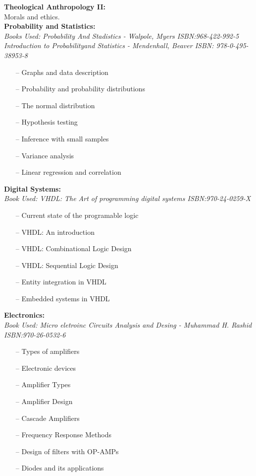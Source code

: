 \documentclass{article}
\begin{document}
\textbf{Theological Anthropology II:}\\
    Morals and ethics.\\
\newpage
\textbf{Probability and Statistics:}\\
    \emph{Books Used: Probability And Stadistics - Walpole, Myers    ISBN:968-422-992-5}\\
    \emph{Introduction to Probabilityand Statistics - Mendenhall, Beaver ISBN: 978-0-495-38953-8}\
    \begin{itemize}
     \setlength\itemsep{0pt}
        \item[--] Graphs and data description
        \item[--] Probability and probability distributions
        \item[--] The normal distribution
        \item[--] Hypothesis testing
        \item[--] Inference with small samples
        \item[--] Variance analysis
        \item[--] Linear regression and correlation
    \end{itemize}

\textbf{Digital Systems:}\\
        \emph{Book Used: VHDL: The Art of programming digital systems  ISBN:970-24-0259-X}
    \begin{itemize}
     \setlength\itemsep{0pt}
      \item[--] Current state of the programable logic
      \item[--] VHDL: An introduction
      \item[--] VHDL: Combinational Logic Design
      \item[--] VHDL: Sequential Logic Design
      \item[--] Entity integration in VHDL
      \item[--] Embedded systems in VHDL
    \end{itemize}
 
\textbf{Electronics:}\\
    \emph{Book Used: Micro eletroinc Circuits Analysis and Desing - Muhammad H. Rashid ISBN:970-26-0532-6}
       \begin{itemize}
     \setlength\itemsep{0pt}
       \item[--] Types of amplifiers
       \item[--] Electronic devices
       \item[--] Amplifier Types
       \item[--] Amplifier Design
       \item[--] Cascade Amplifiers
       \item[--] Frequency Response Methods
       \item[--] Design of filters with OP-AMPs
       \item[--] Diodes and its applications
       \end{itemize}
\end{document}
